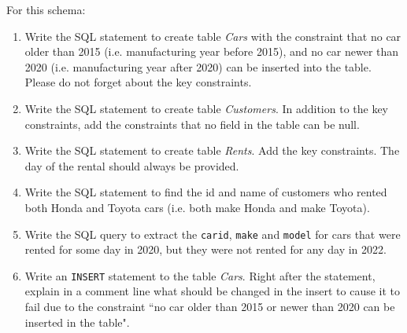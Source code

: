 \documentclass[letterpaper, 11pt]{article}
\begin{document}
For this schema:
\begin{enumerate}[label={\alph*})]
    \item Write the SQL statement to create table \textit{Cars} with the constraint that no car older than 2015 (i.e. manufacturing year before 2015), and no car newer than 2020 (i.e. manufacturing year after 2020) can be inserted into the table. Please do not forget about the key constraints. 
    \item Write the SQL statement to create table \textit{Customers}. In addition to the key constraints, add the constraints that no field in the table can be null.
    \item Write the SQL statement to create table \textit{Rents}. Add the key constraints. The day of the rental should always be provided.
    \item Write the SQL statement to find the id and name of customers who rented both Honda and Toyota cars (i.e. both make Honda and make Toyota).
    \item Write the SQL query to extract the \texttt{carid}, \texttt{make} and \texttt{model} for cars that were rented for some day in 2020, but they were not rented for any day in 2022.
    \item Write an \texttt{INSERT} statement to the table \textit{Cars}. Right after the statement, explain in a comment line what should be changed in the insert to cause it to fail due to the constraint ``no car older than 2015 or newer than 2020 can be inserted in the table".
\end{enumerate}
\end{document}
